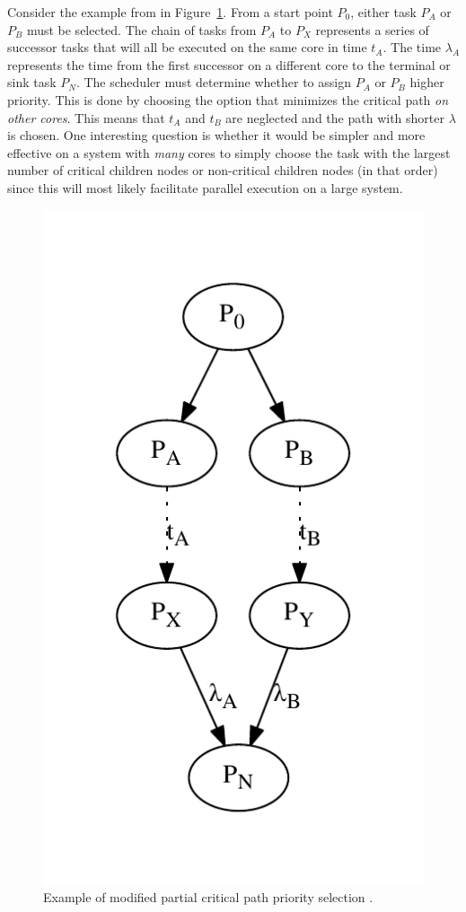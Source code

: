 \documentclass[table,11pt]{article}
\begin{document}
Consider the example from \cite{eles2000scheduling} in Figure~\ref{f:crit_path}. From a start point $P_0$, either task $P_A$ or $P_B$ must be selected. The chain of tasks from $P_A$ to $P_X$ represents a series of successor tasks that will all be executed on the same core in time $t_A$. The time $\lambda_A$ represents the time from the first successor on a different core to the terminal or sink task $P_N$. The scheduler must determine whether to assign $P_A$ or $P_B$ higher priority. This is done by choosing the option that minimizes the critical path \emph{on other cores}. This means that $t_A$ and $t_B$ are neglected and the path with shorter $\lambda$ is chosen. One interesting question is whether it would be simpler and more effective on a system with \emph{many} cores to simply choose the task with the largest number of critical children nodes or non-critical children nodes (in that order) since this will most likely facilitate parallel execution on a large system.

\begin{figure}[h]
\centering
\includegraphics[scale=0.7]{figures/crit_path}
\caption{Example of modified partial critical path priority selection \cite{eles2000scheduling}.}
\label{f:crit_path}
\end{figure}
\end{document}
